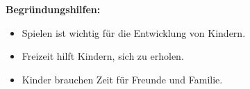 \documentclass[12pt, a4paper]{article}
\newenvironment{cardbox}[1]{%
    \begin{framed}
        \noindent\colorbox{boxcolor}{\makebox[\dimexpr\linewidth-2\fboxsep\relax][c]{\textbf{\textcolor{white}{#1}}}}
        \par\vspace{0.5em}
    }{%
    \end{framed}
}
\newenvironment{hintbox}{%
    \begin{framed}
        \setlength{\fboxsep}{10pt}
        \color{black}
        \itshape
    }{%
    \end{framed}
}
\begin{document}
\begin{multicols}{2}
\begin{cardbox}{BEREICH: FREIZEIT}
            \textbf{Begründungshilfen:}
            \begin{hintbox}
            \begin{itemize}[leftmargin=*]
                \item Spielen ist wichtig für die Entwicklung von Kindern.
                \item Freizeit hilft Kindern, sich zu erholen.
                \item Kinder brauchen Zeit für Freunde und Familie.
            \end{itemize}
            \end{hintbox}
        \end{cardbox}
    \end{multicols}
\end{document}
